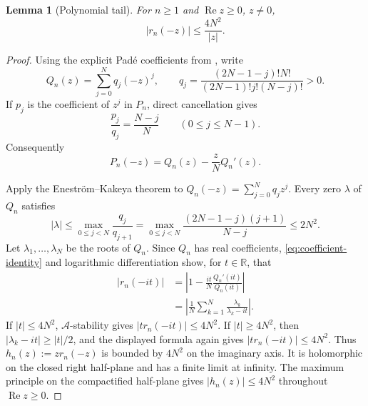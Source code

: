 \documentclass[11pt]{article}
\newtheorem{lemma}[theorem]{Lemma}
\begin{document}
\begin{lemma}[Polynomial tail]\label{lem:tail}
For $n\geq1$ and $\operatorname{Re}z\geq0$, $z\neq0$,
\[
 |r_n(-z)|\leq\frac{4N^2}{|z|}.
\]
\end{lemma}
\begin{proof}
Using the explicit Pad\'e coefficients from \cite{EgertRozendaal}, write
\[
 Q_n(z)=\sum_{j=0}^{N}q_j(-z)^j,\qquad
 q_j=\frac{(2N-1-j)!N!}{(2N-1)!j!(N-j)!}>0.
\]
If $p_j$ is the coefficient of $z^j$ in $P_n$, direct cancellation gives
\[
 \frac{p_j}{q_j}=\frac{N-j}{N}\qquad(0\leq j\leq N-1).
\]
Consequently
\begin{equation}\label{eq:coefficient-identity}
 P_n(-z)=Q_n(z)-\frac zNQ_n'(z).
\end{equation}

Apply the Enestr\"om--Kakeya theorem to
$Q_n(-z)=\sum_{j=0}^{N}q_jz^j$. Every zero $\lambda$ of $Q_n$ satisfies
\[
 |\lambda|\leq\max_{0\leq j<N}\frac{q_j}{q_{j+1}}
 =\max_{0\leq j<N}\frac{(2N-1-j)(j+1)}{N-j}\leq2N^2.
\]
Let $\lambda_1,\ldots,\lambda_N$ be the roots of $Q_n$. Since $Q_n$ has
real coefficients, \eqref{eq:coefficient-identity} and logarithmic
differentiation show, for $t\in\mathbb R$, that
\begin{align*}
 |r_n(-it)|
 &=\left|1-\frac{it}{N}\frac{Q_n'(it)}{Q_n(it)}\right|\\
 &=\left|\frac1N\sum_{k=1}^{N}
             \frac{\lambda_k}{\lambda_k-it}\right|.
\end{align*}
If $|t|\leq4N^2$, $\mathcal A$-stability gives
$|t r_n(-it)|\leq4N^2$. If $|t|\geq4N^2$, then
$|\lambda_k-it|\geq|t|/2$, and the displayed formula again gives
$|t r_n(-it)|\leq4N^2$. Thus $h_n(z):=zr_n(-z)$ is bounded by $4N^2$ on
the imaginary axis. It is holomorphic on the closed right half-plane and has
a finite limit at infinity. The maximum principle on the compactified
half-plane gives $|h_n(z)|\leq4N^2$ throughout $\operatorname{Re}z\geq0$.
\end{proof}
\end{document}
